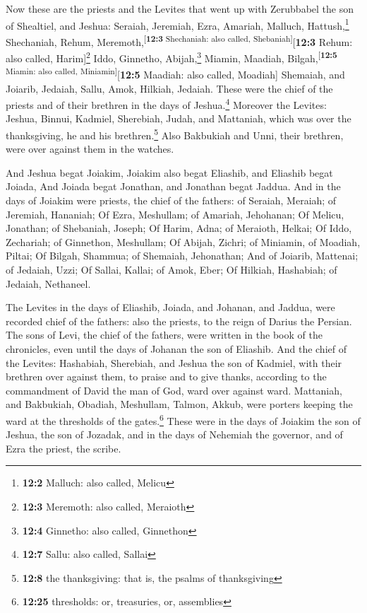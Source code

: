  Now these are the priests and the Levites that went up
with Zerubbabel the son of Shealtiel, and Jeshua: Seraiah, Jeremiah,
Ezra,  Amariah, Malluch, Hattush,\footnote{\textbf{12:2}
  Malluch: also called, Melicu}  Shechaniah, Rehum,
Meremoth,\textsuperscript{{[}\textbf{12:3} Shechaniah: also called,
Shebaniah{]}}{[}\textbf{12:3} Rehum: also called, Harim{]}\footnote{\textbf{12:3}
  Meremoth: also called, Meraioth}  Iddo, Ginnetho,
Abijah,\footnote{\textbf{12:4} Ginnetho: also called, Ginnethon}
 Miamin, Maadiah, Bilgah,\textsuperscript{{[}\textbf{12:5}
Miamin: also called, Miniamin{]}}{[}\textbf{12:5} Maadiah: also called,
Moadiah{]}  Shemaiah, and Joiarib, Jedaiah, 
Sallu, Amok, Hilkiah, Jedaiah. These were the chief of the priests and
of their brethren in the days of Jeshua.\footnote{\textbf{12:7} Sallu:
  also called, Sallai}  Moreover the Levites: Jeshua,
Binnui, Kadmiel, Sherebiah, Judah, and Mattaniah, which was over the
thanksgiving, he and his brethren.\footnote{\textbf{12:8} the
  thanksgiving: that is, the psalms of thanksgiving}  Also
Bakbukiah and Unni, their brethren, were over against them in the
watches.

 And Jeshua begat Joiakim, Joiakim also begat Eliashib,
and Eliashib begat Joiada,  And Joiada begat Jonathan,
and Jonathan begat Jaddua.  And in the days of Joiakim
were priests, the chief of the fathers: of Seraiah, Meraiah; of
Jeremiah, Hananiah;  Of Ezra, Meshullam; of Amariah,
Jehohanan;  Of Melicu, Jonathan; of Shebaniah, Joseph;
 Of Harim, Adna; of Meraioth, Helkai;  Of
Iddo, Zechariah; of Ginnethon, Meshullam;  Of Abijah,
Zichri; of Miniamin, of Moadiah, Piltai;  Of Bilgah,
Shammua; of Shemaiah, Jehonathan;  And of Joiarib,
Mattenai; of Jedaiah, Uzzi;  Of Sallai, Kallai; of Amok,
Eber;  Of Hilkiah, Hashabiah; of Jedaiah, Nethaneel.

 The Levites in the days of Eliashib, Joiada, and
Johanan, and Jaddua, were recorded chief of the fathers: also the
priests, to the reign of Darius the Persian.  The sons of
Levi, the chief of the fathers, were written in the book of the
chronicles, even until the days of Johanan the son of Eliashib.
 And the chief of the Levites: Hashabiah, Sherebiah, and
Jeshua the son of Kadmiel, with their brethren over against them, to
praise and to give thanks, according to the commandment of David the man
of God, ward over against ward.  Mattaniah, and
Bakbukiah, Obadiah, Meshullam, Talmon, Akkub, were porters keeping the
ward at the thresholds of the gates.\footnote{\textbf{12:25} thresholds:
  or, treasuries, or, assemblies}  These were in the days
of Joiakim the son of Jeshua, the son of Jozadak, and in the days of
Nehemiah the governor, and of Ezra the priest, the scribe.

